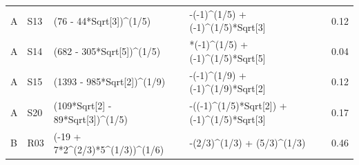 \documentclass[11pt,oneside]{article}
\numberwithin{equation}{section}
\theoremstyle{definition}
\theoremstyle{remark}
\begin{document}
\begin{small}
\begin{longtable}{@{}p{}p{}>{\ttfamily\footnotesize\raggedright\arraybackslash}p{}>{\ttfamily\footnotesize\raggedright\arraybackslash}p{}p{}@{}}
A & S13 & (\allowbreak{}76 - \allowbreak{}44*\allowbreak{}Sqrt[\allowbreak{}3]\allowbreak{})\allowbreak{}\textasciicircum{}\allowbreak{}(\allowbreak{}1/\allowbreak{}5)\allowbreak{} & -(\allowbreak{}-1)\allowbreak{}\textasciicircum{}\allowbreak{}(\allowbreak{}1/\allowbreak{}5)\allowbreak{} + \allowbreak{}(\allowbreak{}-1)\allowbreak{}\textasciicircum{}\allowbreak{}(\allowbreak{}1/\allowbreak{}5)\allowbreak{}*\allowbreak{}Sqrt[\allowbreak{}3]\allowbreak{} & 0.12\\
A & S14 & (\allowbreak{}682 - \allowbreak{}305*\allowbreak{}Sqrt[\allowbreak{}5]\allowbreak{})\allowbreak{}\textasciicircum{}\allowbreak{}(\allowbreak{}1/\allowbreak{}5)\allowbreak{} & -2*\allowbreak{}(\allowbreak{}-1)\allowbreak{}\textasciicircum{}\allowbreak{}(\allowbreak{}1/\allowbreak{}5)\allowbreak{} + \allowbreak{}(\allowbreak{}-1)\allowbreak{}\textasciicircum{}\allowbreak{}(\allowbreak{}1/\allowbreak{}5)\allowbreak{}*\allowbreak{}Sqrt[\allowbreak{}5]\allowbreak{} & 0.04\\
A & S15 & (\allowbreak{}1393 - \allowbreak{}985*\allowbreak{}Sqrt[\allowbreak{}2]\allowbreak{})\allowbreak{}\textasciicircum{}\allowbreak{}(\allowbreak{}1/\allowbreak{}9)\allowbreak{} & -(\allowbreak{}-1)\allowbreak{}\textasciicircum{}\allowbreak{}(\allowbreak{}1/\allowbreak{}9)\allowbreak{} + \allowbreak{}(\allowbreak{}-1)\allowbreak{}\textasciicircum{}\allowbreak{}(\allowbreak{}1/\allowbreak{}9)\allowbreak{}*\allowbreak{}Sqrt[\allowbreak{}2]\allowbreak{} & 0.12\\
A & S20 & (\allowbreak{}109*\allowbreak{}Sqrt[\allowbreak{}2]\allowbreak{} - \allowbreak{}89*\allowbreak{}Sqrt[\allowbreak{}3]\allowbreak{})\allowbreak{}\textasciicircum{}\allowbreak{}(\allowbreak{}1/\allowbreak{}5)\allowbreak{} & -(\allowbreak{}(\allowbreak{}-1)\allowbreak{}\textasciicircum{}\allowbreak{}(\allowbreak{}1/\allowbreak{}5)\allowbreak{}*\allowbreak{}Sqrt[\allowbreak{}2]\allowbreak{})\allowbreak{} + \allowbreak{}(\allowbreak{}-1)\allowbreak{}\textasciicircum{}\allowbreak{}(\allowbreak{}1/\allowbreak{}5)\allowbreak{}*\allowbreak{}Sqrt[\allowbreak{}3]\allowbreak{} & 0.17\\
B & R03 & (\allowbreak{}-19 + \allowbreak{}7*\allowbreak{}2\textasciicircum{}\allowbreak{}(\allowbreak{}2/\allowbreak{}3)\allowbreak{}*\allowbreak{}5\textasciicircum{}\allowbreak{}(\allowbreak{}1/\allowbreak{}3)\allowbreak{})\allowbreak{}\textasciicircum{}\allowbreak{}(\allowbreak{}1/\allowbreak{}6)\allowbreak{} & -(\allowbreak{}2/\allowbreak{}3)\allowbreak{}\textasciicircum{}\allowbreak{}(\allowbreak{}1/\allowbreak{}3)\allowbreak{} + \allowbreak{}(\allowbreak{}5/\allowbreak{}3)\allowbreak{}\textasciicircum{}\allowbreak{}(\allowbreak{}1/\allowbreak{}3)\allowbreak{} & 0.46\\

\end{longtable}
\end{small}
\end{document}
